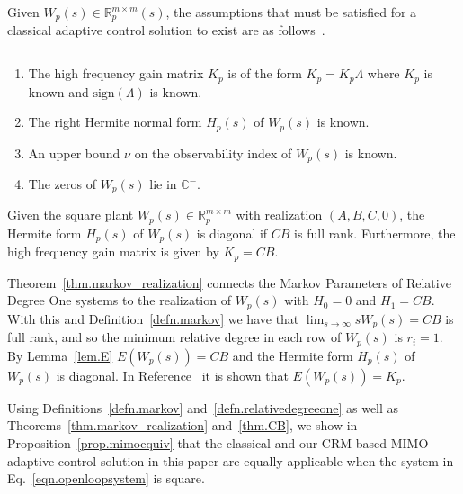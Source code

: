 \documentclass[]{../sty/JGCD}
\theoremstyle{examplestyle}
\newenvironment{customthm}[1]
  {\renewcommand\theinnercustomthm{#1}\innercustomthm\normalfont}
  {\endinnercustomthm}
\begin{document}
  Given $W_{p}(s)\in\mathbb{R}_{p}^{m\times m}(s)$, the assumptions that must be satisfied for a classical adaptive control solution to exist are as follows\ \cite{narendra.stable.2005}.

  \begin{customthm}{2} $\;$\label{ass.classical}
    \begin{enumerate}[(\roman{enumi}), ref=\roman{enumi}]
      \itemsep0em
      \item{The high frequency gain matrix $K_{p}$ is of the form $K_{p}=\overline{K}_{p}\Lambda$ where $\overline{K}_{p}$ is known and $\text{sign}(\Lambda)$ is known.\label{ass.kp}}
      \item{The right Hermite normal form $H_{p}(s)$ of $W_{p}(s)$ is known.\label{ass.hermite}}
      \item{An upper bound $\nu$ on the observability index of $W_{p}(s)$ is known.\label{ass.nu}}
      \item{The zeros of $W_{p}(s)$ lie in $\mathbb{C}^{-}$.\label{ass.tzeroWp}}
    \end{enumerate}
  \end{customthm}

  \begin{thm-dan}\label{thm.CB}
    Given the square plant $W_{p}(s)\in\mathbb{R}_{p}^{m\times m}$ with realization $(A,B,C,0)$, the Hermite form $H_{p}(s)$ of $W_{p}(s)$ is diagonal if $CB$ is full rank.
    Furthermore, the high frequency gain matrix is given by $K_{p}=CB$.
  \end{thm-dan}

  \begin{proof-dan}
    Theorem~\ref{thm.markov_realization} connects the Markov Parameters of Relative Degree One systems to the realization of $W_{p}(s)$ with $H_{0}=0$ and $H_{1}=CB$.
    With this and Definition~\ref{defn.markov} we have that $\lim_{s\rightarrow\infty}sW_{p}(s)=CB$ is full rank, and so the minimum relative degree in each row of $W_{p}(s)$ is $r_{i}=1$.
    By Lemma~\ref{lem.E} $E(W_{p}(s))=CB$ and the Hermite form $H_{p}(s)$ of $W_{p}(s)$ is diagonal.
    In Reference\ \cite{narendra.stable.2005} it is shown that $E(W_{p}(s))=K_{p}$.
  \end{proof-dan}

  Using Definitions~\ref{defn.markov} and~\ref{defn.relativedegreeone} as well as Theorems~\ref{thm.markov_realization} and~\ref{thm.CB}, we show in Proposition~\ref{prop.mimoequiv} that the classical and our CRM based MIMO adaptive control solution in this paper are equally applicable when the system in Eq.\ \eqref{eqn.openloopsystem} is square.
\end{document}
